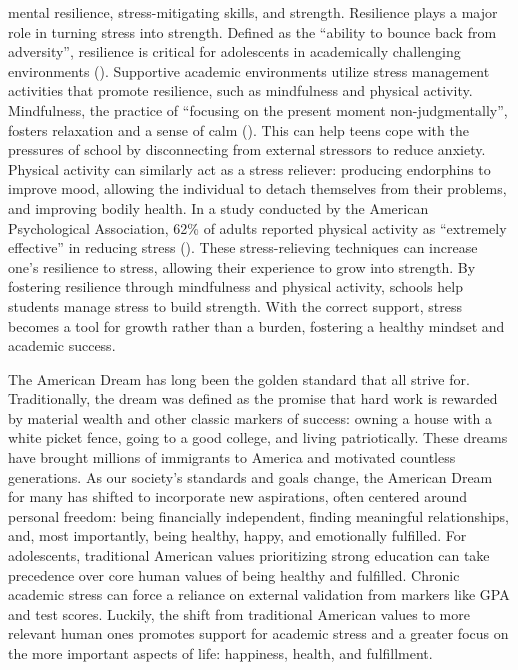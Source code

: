 mental resilience, stress-mitigating skills, and strength. Resilience plays a major role in turning stress into strength. Defined as the “ability to bounce back from adversity”, resilience is critical for adolescents in academically challenging environments (\cite{claney2023}). Supportive academic environments utilize stress management activities that promote resilience, such as mindfulness and physical activity. Mindfulness, the practice of “focusing on the present moment non-judgmentally”, fosters relaxation and a sense of calm (\cite{claney2023}). This can help teens cope with the pressures of school by disconnecting from external stressors to reduce anxiety. Physical activity can similarly act as a stress reliever: producing endorphins to improve mood, allowing the individual to detach themselves from their problems, and improving bodily health. In a study conducted by the American Psychological Association, 62\% of adults reported physical activity as “extremely effective” in reducing stress (\cite{apa2014stress}). These stress-relieving techniques can increase one’s resilience to stress, allowing their experience to grow into strength. By fostering resilience through mindfulness and physical activity, schools help students manage stress to build strength. With the correct support, stress becomes a tool for growth rather than a burden, fostering a healthy mindset and academic success. 

The American Dream has long been the golden standard that all strive for. Traditionally, the dream was defined as the promise that hard work is rewarded by material wealth and other classic markers of success: owning a house with a white picket fence, going to a good college, and living patriotically. These dreams have brought millions of immigrants to America and motivated countless generations. As our society’s standards and goals change, the American Dream for many has shifted to incorporate new aspirations, often centered around personal freedom: being financially independent, finding meaningful relationships, and, most importantly, being healthy, happy, and emotionally fulfilled. For adolescents, traditional American values prioritizing strong education can take precedence over core human values of being healthy and fulfilled. Chronic academic stress can force a reliance on external validation from markers like GPA and test scores. Luckily, the shift from traditional American values to more relevant human ones promotes support for academic stress and a greater focus on the more important aspects of life: happiness, health, and fulfillment.


